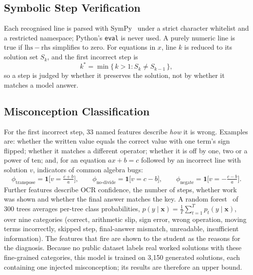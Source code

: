 \documentclass[runningheads]{llncs}
\begin{document}
\subsection{Symbolic Step Verification}

Each recognised line is parsed with SymPy~\cite{meurer2017} under a strict character whitelist and a restricted namespace; Python's \texttt{eval} is never used. A purely numeric line is true if $\mathrm{lhs}-\mathrm{rhs}$ simplifies to zero. For equations in $x$, line $k$ is reduced to its solution set $S_k$, and the first incorrect step is
\begin{equation}
k^{*}=\min\{\,k>1 : S_k\neq S_{k-1}\,\},
\end{equation}
so a step is judged by whether it preserves the solution, not by whether it matches a model answer.

\subsection{Misconception Classification}

For the first incorrect step, 33 named features describe \emph{how} it is wrong. Examples are: whether the written value equals the correct value with one term's sign flipped; whether it matches a different operator; whether it is off by one, two or a power of ten; and, for an equation $ax+b=c$ followed by an incorrect line with solution $v$, indicators of common algebra bugs:
\begin{equation}
\phi_{\text{transpose}}=\mathbf{1}\bigl[v=\tfrac{c+b}{a}\bigr],\qquad
\phi_{\text{no-divide}}=\mathbf{1}\bigl[v=c-b\bigr],\qquad
\phi_{\text{negate}}=\mathbf{1}\bigl[v=-\tfrac{c-b}{a}\bigr].
\end{equation}
Further features describe OCR confidence, the number of steps, whether work was shown and whether the final answer matches the key. A random forest~\cite{breiman2001} of 300 trees averages per-tree class probabilities, $p(y\mid\mathbf{x})=\frac{1}{T}\sum_{t=1}^{T}p_t(y\mid\mathbf{x})$, over nine categories (correct, arithmetic slip, sign error, wrong operation, moving terms incorrectly, skipped step, final-answer mismatch, unreadable, insufficient information). The features that fire are shown to the student as the reasons for the diagnosis. Because no public dataset labels real worked solutions with these fine-grained categories, this model is trained on 3,150 generated solutions, each containing one injected misconception; its results are therefore an upper bound.
\end{document}
